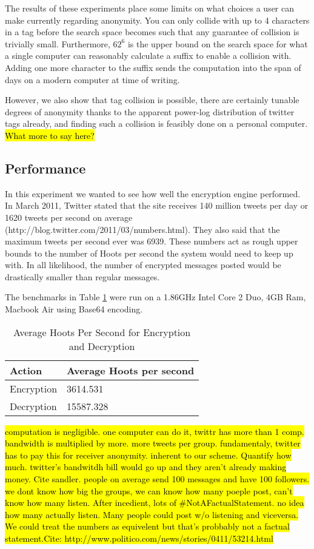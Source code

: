 The results of these experiments place some limits on what choices a user can make currently regarding anonymity. You can only collide with up to 4 characters in a tag before the search space becomes such that any guarantee of collision is trivially small. Furthermore, $62^6$ is the upper bound on the search space for what a single computer can reasonably calculate a suffix to enable a collision with. Adding one more character to the suffix sends the computation into the span of days on a modern computer at time of writing.

However, we also show that tag collision is possible, there are certainly tunable degrees of anonymity thanks to the apparent power-log distribution of twitter tags already, and finding such a collision is feasibly done on a personal computer. \hl{What more to say here?}

\subsection{Performance}

In this experiment we wanted to see how well the encryption engine performed. In March 2011, Twitter stated that the site receives 140 million tweets per day or 1620 tweets per second on average (http://blog.twitter.com/2011/03/numbers.html). They also said that the maximum tweets per second ever was 6939. These numbers act as rough upper bounds to the number of Hoots per second the system would need to keep up with. In all likelihood, the number of encrypted messages posted would be drastically smaller than regular messages.

The benchmarks in Table \ref{tab:hps} were run on a 1.86GHz Intel Core 2 Duo, 4GB Ram, Macbook Air using Base64 encoding.


\begin{table}
\caption{Average Hoots Per Second for Encryption and Decryption
\label{tab:hps}
}
\begin{center}
    \begin{tabular}{ l  l }
	\hline
	Action & Average Hoots per second \\ \hline
	Encryption & 3614.531 \\
	Decryption & 15587.328 \\ \hline
    \end{tabular}
\end{center}
\end{table}


\hl{computation is negligible. one computer can do it, twittr has more than 1 comp. bandwidth is multiplied by more. more tweets per group. fundamentaly, twitter has to pay this for receiver anonymity. inherent to our scheme. Quantify how much. twitter's bandwitdh bill would go up and they aren't already making money. Cite sandler. people on average send 100 messages and have 100 followers. we dont know how big the groups, we can know how many poeple post, can't know how many listen. After incedient, lots of \#NotAFactualStatement. no idea how many actually listen. Many people could post w/o listening and viceversa. We could treat the numbers as equivelent but that's probbably not a factual statement.Cite: http://www.politico.com/news/stories/0411/53214.html}

